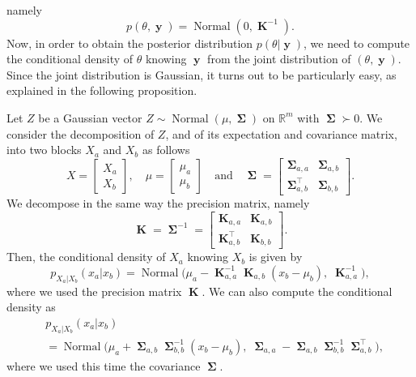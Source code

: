 \documentclass[
	fontsize=11pt, %
	twoside=false, %
	numbers=noenddot, %
]{kaobook}
\DeclareMathOperator{\bK}{{\boldsymbol K}}
\DeclareMathOperator{\by}{{\boldsymbol y}}
\DeclareMathOperator{\bSigma}{\boldsymbol \Sigma}
\DeclareMathOperator{\nor}{Normal}
\newcommand{\R}{\mathbb R}
\begin{document}
namely 
\begin{equation*}
	p(\theta, \by) = \nor(0, \bK^{-1}).
\end{equation*}
Now, in order to obtain the posterior distribution $p(\theta | \by)$, we need to compute the conditional density of $\theta$ 
knowing $\by$ from the joint distribution of $(\theta, \by)$.
Since the joint distribution is Gaussian, it turns out to be particularly easy, as explained in the following proposition.
\begin{proposition}
	\label{prop:cond-gaussian-vector}
	Let $Z$ be a Gaussian vector $Z \sim \nor(\mu, \bSigma)$ on $\R^m$ with $\bSigma \succ 0$. 
	We consider the decomposition of $Z$, and of its expectation and covariance matrix, into two blocks $X_a$ and $X_b$ as follows
	\begin{equation*}
		X = 
		\begin{bmatrix}
			X_a \\
			X_b
		\end{bmatrix},
		\quad
		\mu =
		\begin{bmatrix}
			\mu_a \\
			\mu_b	
		\end{bmatrix}
		\quad \text{and} \quad
		\bSigma = 
		\begin{bmatrix}
			\bSigma_{a, a} & \bSigma_{a, b} \\
			\bSigma_{a, b}^\top & \bSigma_{b, b}
		\end{bmatrix}.
	\end{equation*}
	We decompose in the same way the precision matrix, namely
	\begin{equation}
		\bK = \bSigma^{-1} =
		\begin{bmatrix}
			\bK_{a, a} & \bK_{a, b} \\
			\bK_{a, b}^\top & \bK_{b, b}
		\end{bmatrix}.		
	\end{equation}
	Then, the conditional density of $X_a$ knowing $X_b$ is given by
	\begin{equation*}
		p_{X_a | X_b}(x_a | x_b) = 
		\nor \Big( \mu_a - \bK_{a, a}^{-1} \bK_{a, b} (x_b - \mu_b), 
		\; \bK_{a, a}^{-1} \Big),
	\end{equation*}
	where we used the precision matrix $\bK$. 
	We can also compute the conditional density as
	\begin{align*}
		&p_{X_a | X_b}(x_a | x_b) \\
		&= \nor \Big( \mu_a + \bSigma_{a, b} \bSigma_{b, b}^{-1} (x_b - \mu_b), 
		\; \bSigma_{a, a} - \bSigma_{a, b} \bSigma_{b, b}^{-1} \bSigma_{a, b}^\top \Big),	
	\end{align*}
	where we used this time the covariance $\bSigma$.
\end{proposition}
\end{document}
